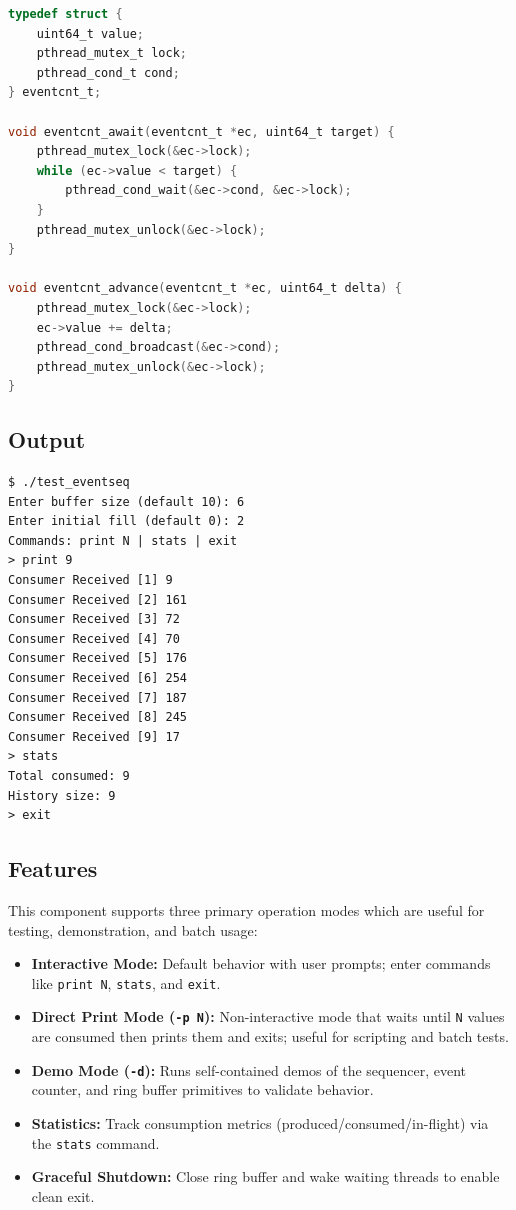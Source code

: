 \documentclass[12pt,a4paper]{article}
\begin{document}
\begin{lstlisting}[language=C, caption={Event Counter Implementation}]
typedef struct {
    uint64_t value;
    pthread_mutex_t lock;
    pthread_cond_t cond;
} eventcnt_t;

void eventcnt_await(eventcnt_t *ec, uint64_t target) {
    pthread_mutex_lock(&ec->lock);
    while (ec->value < target) {
        pthread_cond_wait(&ec->cond, &ec->lock);
    }
    pthread_mutex_unlock(&ec->lock);
}

void eventcnt_advance(eventcnt_t *ec, uint64_t delta) {
    pthread_mutex_lock(&ec->lock);
    ec->value += delta;
    pthread_cond_broadcast(&ec->cond);
    pthread_mutex_unlock(&ec->lock);
}
\end{lstlisting}

\subsection{Output}
\begin{tcolorbox}[colback=green!5!white,colframe=green!75!black,title=Interactive Mode Output]
\begin{verbatim}
$ ./test_eventseq
Enter buffer size (default 10): 6
Enter initial fill (default 0): 2
Commands: print N | stats | exit
> print 9
Consumer Received [1] 9
Consumer Received [2] 161
Consumer Received [3] 72
Consumer Received [4] 70
Consumer Received [5] 176
Consumer Received [6] 254
Consumer Received [7] 187
Consumer Received [8] 245
Consumer Received [9] 17
> stats
Total consumed: 9
History size: 9
> exit
\end{verbatim}
\end{tcolorbox}

\subsection{Features}
This component supports three primary operation modes which are useful for
testing, demonstration, and batch usage:
\begin{itemize}[leftmargin=*]
    \item \textbf{Interactive Mode:} Default behavior with user prompts; enter commands like \texttt{print N}, \texttt{stats}, and \texttt{exit}.
    \item \textbf{Direct Print Mode (\texttt{-p N}):} Non-interactive mode that waits until \texttt{N} values are consumed then prints them and exits; useful for scripting and batch tests.
    \item \textbf{Demo Mode (\texttt{-d}):} Runs self-contained demos of the sequencer, event counter, and ring buffer primitives to validate behavior.
    \item \textbf{Statistics:} Track consumption metrics (produced/consumed/in-flight) via the \texttt{stats} command.
    \item \textbf{Graceful Shutdown:} Close ring buffer and wake waiting threads to enable clean exit.
\end{itemize}
\end{document}
